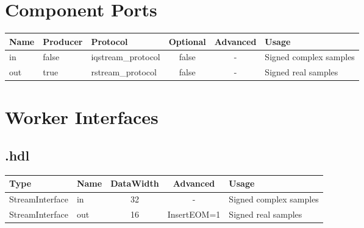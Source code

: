 \begin{landscape}
\begin{scriptsize}
\begin{longtable}
		\end{longtable}
	\end{scriptsize}

	\section*{Component Ports}
	\begin{scriptsize}
		\begin{tabular}{|M{2cm}|M{1.5cm}|M{4cm}|c|c|M{9cm}|}
			\hline
			Name & Producer & Protocol           & Optional & Advanced & Usage                  \\
			\hline
			in   & false    & iqstream\_protocol & false    & -        & Signed complex samples \\
			\hline
			out  & true     & rstream\_protocol  & false    & -        & Signed real samples    \\
			\hline
		\end{tabular}
	\end{scriptsize}

	\section*{Worker Interfaces}
	\subsection*{\comp.hdl}
	\begin{scriptsize}
		\begin{tabular}{|M{2cm}|M{1.5cm}|c|c|M{12cm}|}
			\hline
			\rowcolor{blue}
			Type            & Name & DataWidth & Advanced                & Usage                  \\
			\hline
			StreamInterface & in   & 32        & - & Signed complex samples \\
			\hline
			StreamInterface & out  & 16        & InsertEOM=1 & Signed real samples    \\
			\hline
		\end{tabular}
	\end{scriptsize}
\end{landscape}

